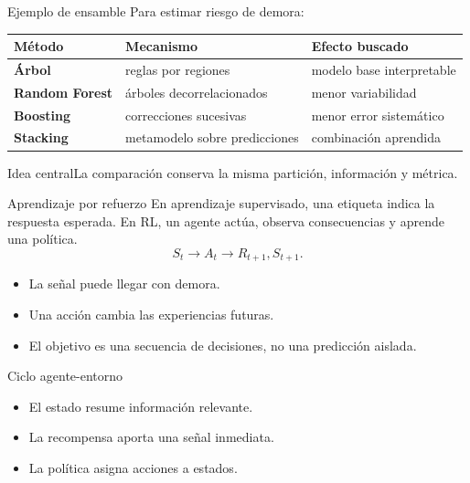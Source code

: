 \documentclass[aspectratio=169,10pt]{beamer}
\newcommand{\idea}[1]{\begin{block}{Idea central}#1\end{block}}
\begin{document}
\begin{frame}{Ejemplo de ensamble}
  \small
  Para estimar riesgo de demora:
  \begin{tabularx}{\textwidth}{>{\bfseries}p{}XX}\toprule
  Método & Mecanismo & Efecto buscado\\\midrule
  Árbol & reglas por regiones & modelo base interpretable\\
  Random Forest & árboles decorrelacionados & menor variabilidad\\
  Boosting & correcciones sucesivas & menor error sistemático\\
  Stacking & metamodelo sobre predicciones & combinación aprendida\\\bottomrule
  \end{tabularx}
  \idea{La comparación conserva la misma partición, información y métrica.}
\end{frame}

\begin{frame}{Aprendizaje por refuerzo}
  En aprendizaje supervisado, una etiqueta indica la respuesta esperada. En RL, un agente actúa, observa consecuencias y aprende una política.
  \[
    S_t\rightarrow A_t\rightarrow R_{t+1},S_{t+1}.
  \]
  \begin{itemize}
    \item La señal puede llegar con demora.
    \item Una acción cambia las experiencias futuras.
    \item El objetivo es una secuencia de decisiones, no una predicción aislada.
  \end{itemize}
\end{frame}

\begin{frame}{Ciclo agente-entorno}
  \begin{center}
  \end{center}
  \begin{itemize}
    \item El estado resume información relevante.
    \item La recompensa aporta una señal inmediata.
    \item La política asigna acciones a estados.
  \end{itemize}
\end{frame}
\end{document}
